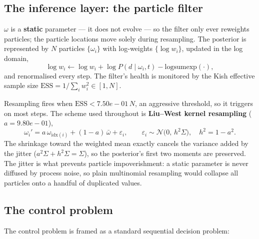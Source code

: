 \documentclass[12pt,a4paper]{article}
\begin{document}
\subsection{The inference layer: the particle filter}
\label{sec:particle-filter}
$\omega$ is a \textbf{static} parameter --- it does not evolve --- so the
filter only ever reweights particles; the particle locations move solely
during resampling. The posterior is represented by $N$ particles
$\{\omega_i\}$ with log-weights $\{\log w_i\}$, updated in the log domain,
\begin{equation}
  \log w_i \leftarrow \log w_i + \log P(d \mid \omega_i, t)
                    - \mathrm{logsumexp}(\cdot),
  \label{eq:bayes-update}
\end{equation}
and renormalised every step. The filter's health is monitored by the Kish
effective sample size $\mathrm{ESS} = 1/\sum_i w_i^{2} \in [1, N]$.

Resampling fires when $\mathrm{ESS} < 7.50e-01\,N$, an aggressive threshold,
so it triggers on most steps. The scheme used throughout is \textbf{Liu--West
kernel resampling} ($a = 9.80e-01$),
\begin{equation}
  \omega_i' = a\,\omega_{\mathrm{idx}(i)} + (1-a)\,\bar{\omega}
              + \varepsilon_i,
  \qquad \varepsilon_i \sim \mathcal{N}\bigl(0,\, h^{2}\Sigma\bigr),
  \quad h^{2} = 1 - a^{2}.
  \label{eq:liu-west}
\end{equation}
The shrinkage toward the weighted mean exactly cancels the variance added by
the jitter ($a^{2}\Sigma + h^{2}\Sigma = \Sigma$), so the posterior's first
two moments are preserved. The jitter is what prevents particle
impoverishment: a static parameter is never diffused by process noise, so
plain multinomial resampling would collapse all particles onto a handful of
duplicated values.

\subsection{The control problem}
\label{sec:control-problem}
The control problem is framed as a standard sequential decision problem:
\end{document}
